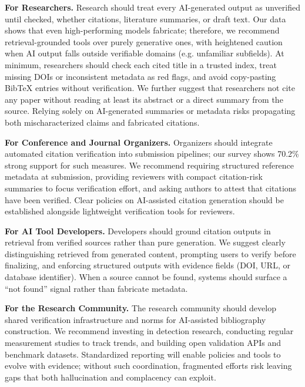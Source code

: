 \noindent
\textbf{For Researchers.}
Research should treat every AI-generated output as unverified until checked, whether citations, literature summaries, or draft text.
Our data shows that even high-performing models fabricate; therefore, we recommend retrieval-grounded tools over purely generative ones, with heightened caution when AI output falls outside verifiable domains (e.g. unfamiliar subfields).
At minimum, researchers should check each cited title in a trusted index, treat missing DOIs or inconsistent metadata as red flags, and avoid copy-pasting BibTeX entries without verification.
We further suggest that researchers not cite any paper without reading at least its abstract or a direct summary from the source. Relying solely on AI-generated summaries or metadata risks propagating both mischaracterized claims and fabricated citations.

\noindent
\textbf{For Conference and Journal Organizers.}
Organizers should integrate automated citation verification into submission pipelines; our survey shows 70.2\% strong support for such measures.
We recommend requiring structured reference metadata at submission, providing reviewers with compact citation-risk summaries to focus verification effort, and asking authors to attest that citations have been verified.
Clear policies on AI-assisted citation generation should be established alongside lightweight verification tools for reviewers.


\noindent
\textbf{For AI Tool Developers.}
Developers should ground citation outputs in retrieval from verified sources rather than pure generation.
We suggest clearly distinguishing retrieved from generated content, prompting users to verify before finalizing, and enforcing structured outputs with evidence fields (DOI, URL, or database identifier).
When a source cannot be found, systems should surface a ``not found'' signal rather than fabricate metadata.

\noindent
\textbf{For the Research Community.}
The research community should develop shared verification infrastructure and norms for AI-assisted bibliography construction.
We recommend investing in detection research, conducting regular measurement studies to track trends, and building open validation APIs and benchmark datasets.
Standardized reporting will enable policies and tools to evolve with evidence; without such coordination, fragmented efforts risk leaving gaps that both hallucination and complacency can exploit.



